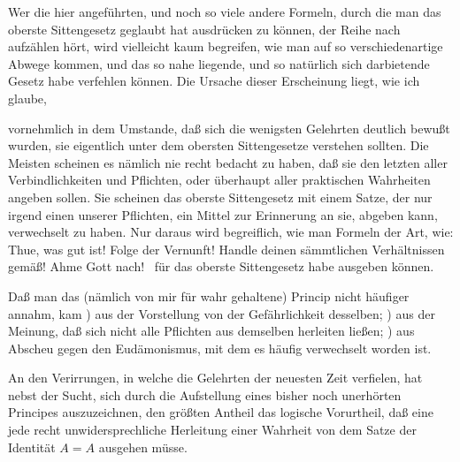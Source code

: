 \begin{RWanm} 
Wer die hier angeführten, und noch so viele andere Formeln, durch die man das oberste Sittengesetz geglaubt hat ausdrücken zu können, der Reihe nach aufzählen hört, wird vielleicht kaum begreifen, wie man auf so verschiedenartige Abwege kommen, und das so nahe liegende, und so natürlich sich darbietende  Gesetz habe verfehlen können. Die Ursache dieser Erscheinung liegt, wie ich glaube,
\begin{aufzb}
\item vornehmlich in dem Umstande, daß sich die wenigsten Gelehrten deutlich bewußt wurden,  sie eigentlich unter dem obersten Sittengesetze verstehen sollten. Die Meisten scheinen es nämlich nie recht bedacht zu haben, daß sie den letzten  aller Verbindlichkeiten und Pflichten, oder überhaupt aller praktischen Wahrheiten angeben sollen. Sie scheinen das oberste Sittengesetz mit einem Satze, der nur irgend einen  unserer Pflichten, ein Mittel zur Erinnerung an sie, abgeben kann, verwechselt zu haben. Nur daraus wird begreiflich, wie man Formeln der Art, wie: Thue, was gut ist! Folge der Vernunft! Handle deinen sämmtlichen Verhältnissen gemäß! Ahme Gott nach! \udgl\  für das oberste Sittengesetz habe ausgeben können.~
\item Daß man das  (nämlich von mir für wahr gehaltene) Princip nicht häufiger annahm, kam ) aus der Vorstellung von der Gefährlichkeit desselben; ) aus der Meinung, daß sich nicht alle Pflichten aus demselben herleiten ließen; ) aus Abscheu gegen den Eudämonismus, mit dem es häufig verwechselt worden ist.
\item An den Verirrungen, in welche die Gelehrten der neuesten Zeit verfielen, hat nebst der Sucht, sich durch die Aufstellung eines bisher noch unerhörten Principes auszuzeichnen, den größten Antheil das logische Vorurtheil, daß eine jede recht unwidersprechliche Herleitung einer Wahrheit von dem Satze der Identität $A = A$ ausgehen müsse.

\end{aufzb}
\end{RWanm}
